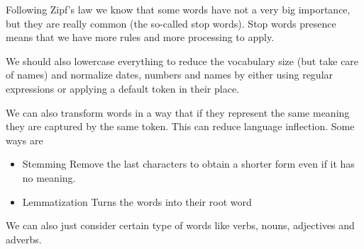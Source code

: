 \vspace{10pt}

Following Zipf's law we know that some words have not a very big importance, but they are really common (the so-called stop words). Stop words presence means that we have more rules and more processing to apply. 

We should also lowercase everything to reduce the vocabulary size (but take care of names) and normalize dates, numbers and names by either using regular expressions or applying a default token in their place.

\vspace{10pt}

We can also transform words in a way that if they represent the same meaning they are captured by the same token. This can reduce language inflection.
Some ways are

\begin{itemize}
    \item Stemming \ra Remove the last characters to obtain a shorter form even if it has no meaning.
    \item Lemmatization \ra Turns the words into their root word
\end{itemize}

We can also just consider certain type of words like verbs, nouns, adjectives and adverbs. 





